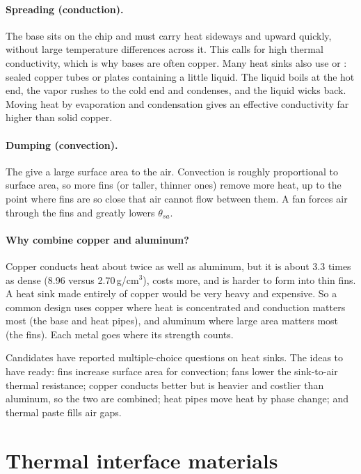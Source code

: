 \paragraph{Spreading (conduction).} The base sits on the chip and must carry heat sideways and upward quickly, without large temperature differences across it. This calls for high thermal conductivity, which is why bases are often copper. Many heat sinks also use  or : sealed copper tubes or plates containing a little liquid. The liquid boils at the hot end, the vapor rushes to the cold end and condenses, and the liquid wicks back. Moving heat by evaporation and condensation gives an effective conductivity far higher than solid copper.

\paragraph{Dumping (convection).} The  give a large surface area to the air. Convection is roughly proportional to surface area, so more fins (or taller, thinner ones) remove more heat, up to the point where fins are so close that air cannot flow between them. A fan forces air through the fins and greatly lowers $\theta_{sa}$.

\paragraph{Why combine copper and aluminum?} Copper conducts heat about twice as well as aluminum, but it is about 3.3 times as dense (8.96 versus 2.70\,g/cm$^3$), costs more, and is harder to form into thin fins. A heat sink made entirely of copper would be very heavy and expensive. So a common design uses copper where heat is concentrated and conduction matters most (the base and heat pipes), and aluminum where large area matters most (the fins). Each metal goes where its strength counts.

\begin{onoa}
Candidates have reported multiple-choice questions on heat sinks. The ideas to have ready: fins increase surface area for convection; fans lower the sink-to-air thermal resistance; copper conducts better but is heavier and costlier than aluminum, so the two are combined; heat pipes move heat by phase change; and thermal paste fills air gaps.
\end{onoa}

\section{Thermal interface materials}


